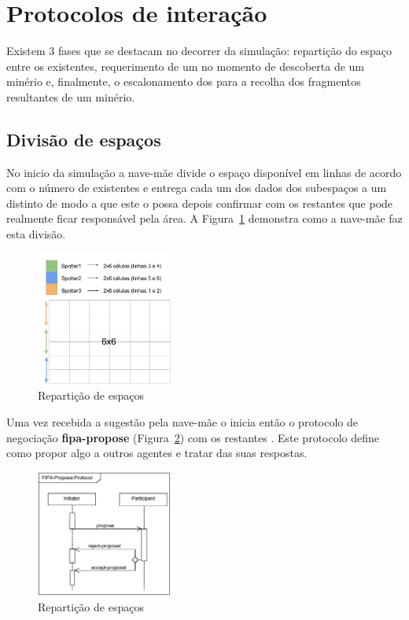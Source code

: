 \documentclass[12pt]{report}
\begin{document}
\section{Protocolos de interação}

Existem 3 fases que se destacam no decorrer da simulação: repartição do espaço entre os \spotters existentes, requerimento de um \producer no momento de descoberta de um minério e, finalmente, o escalonamento dos \transporters para a recolha dos fragmentos resultantes de um minério.

\subsection{Divisão de espaços}
No inicio da simulação a nave-mãe divide o espaço disponível em linhas de acordo com o número de \spotters existentes e entrega cada um dos dados dos subespaços a um \spotter distinto de modo a que este o possa depois confirmar com os restantes \spotters que pode realmente ficar responsável pela área. A Figura~\ref{space-sharing} demonstra como a nave-mãe faz esta divisão.

\begin{figure}[h]
	\centering
	\includegraphics[width=0.4\textwidth]{space-sharing}
	\caption{Repartição de espaços}
	\label{space-sharing}
\end{figure}

Uma vez recebida a sugestão pela nave-mãe o \spotter inicia então o protocolo de negociação \textbf{fipa-propose} (Figura~\ref{fipa-propose}) com os restantes \spotters. Este protocolo define como propor algo a outros agentes e
tratar das suas respostas.

\begin{figure}[h]
	\centering
	\includegraphics[width=0.4\textwidth]{fipa-propose}
	\caption{Repartição de espaços}
	\label{fipa-propose}
\end{figure}
\end{document}
